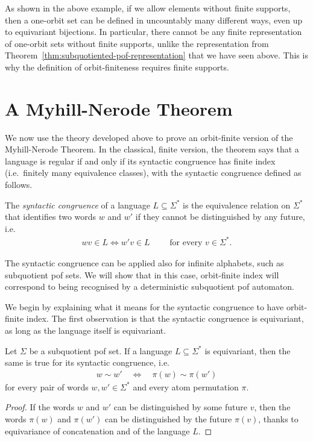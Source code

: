 As shown in the above example, if we allow elements without finite supports, then a one-orbit set can be defined in uncountably many different ways, even up to equivariant bijections. In particular, there cannot be any finite representation of one-orbit sets without finite supports, unlike the representation from Theorem~\ref{thm:subquotiented-pof-representation} that we have seen above. This is why the definition of orbit-finiteness requires finite supports. 

 

\section{A Myhill-Nerode Theorem}
\label{sec:myhill-nerode-equality}
We now use the theory developed above to prove an orbit-finite version of the Myhill-Nerode Theorem. In the classical, finite version, the theorem says that a language is regular if and only if its syntactic congruence has finite index (i.e.~finitely many equivalence classes), with the syntactic congruence defined as follows. 
\begin{definition}
    \label{def:syntactic-congruence}
    The \emph{syntactic congruence} of a language $L \subseteq \Sigma^*$ is the equivalence relation on $\Sigma^*$ that identifies two words $w$ and $w'$ if they cannot be distinguished by any future, i.e.
    \begin{align*}
    wv \in L \Leftrightarrow w'v \in L \qquad \text{ for every $v \in \Sigma^*$.}
    \end{align*}
\end{definition}

The syntactic congruence can be applied also for infinite alphabets, such as subquotient pof sets. We will show that in this case, orbit-finite index will correspond to being recognised by a deterministic subquotient pof automaton. 


We begin by explaining what it means for the syntactic congruence to have orbit-finite index. The first observation is that the syntactic congruence is equivariant, as long as the language itself is equivariant.

\begin{lemma}
    Let $\Sigma$ be a subquotient pof set. If a language $L \subseteq \Sigma^*$ is equivariant, then the same is true for its syntactic congruence, i.e.
    \begin{align*}
    w \sim w' 
    \quad \Leftrightarrow \quad
    \pi(w) \sim \pi(w')
    \end{align*}
    for every pair of words $w,w' \in \Sigma^*$ and every atom permutation $\pi$.
\end{lemma}
\begin{proof}
    If the words $w$ and $w'$ can be distinguished by some future $v$, then the words $\pi(w)$ and $\pi(w')$ can be distinguished by the future $\pi(v)$, thanks to equivariance of concatenation and of the language $L$.
\end{proof}

